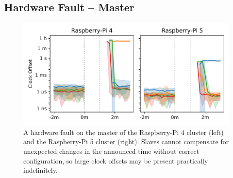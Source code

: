 \subsection{Hardware Fault -- Master}

\begin{figure}
    \centering
    \includegraphics[width=\linewidth]{res/generated/fault/hardware/master_cluster_comparison.pdf}
    \legend
    \caption{A hardware fault on the master of the Raspberry-Pi 4 cluster (left) and the Raspberry-Pi 5 cluster (right). Slaves cannot compensate for unexpected changes in the announced time without correct configuration, so large clock offsets may be present practically indefinitely.}
    \label{fig:hardware_fault_master}
\end{figure}


